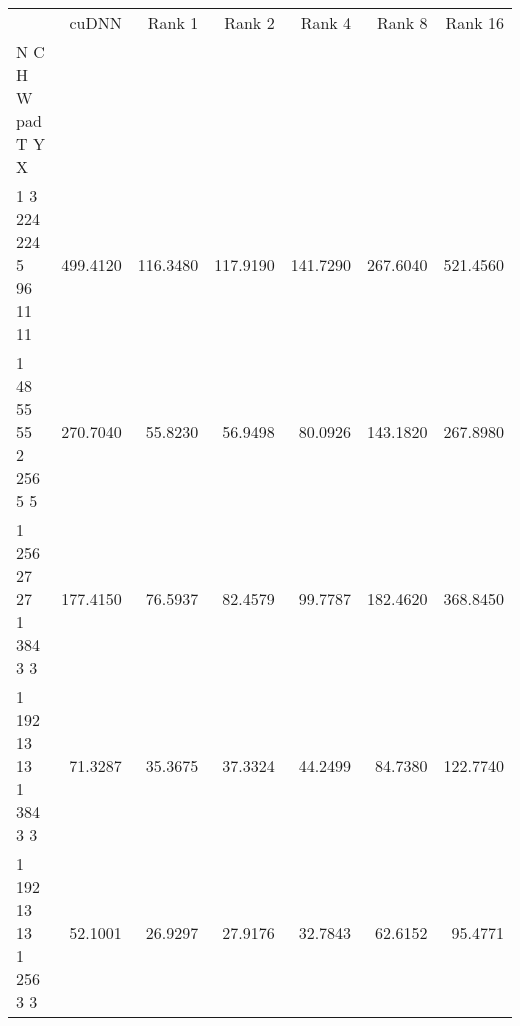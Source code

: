 \begin{tabular}{lrrrrrr}
\toprule
{} &     cuDNN &    Rank 1 &    Rank 2 &    Rank 4 &    Rank 8 &   Rank 16 \\
N C H W pad T Y X      &           &           &           &           &           &           \\
\midrule
1 3 224 224 5 96 11 11 &  499.4120 &  116.3480 &  117.9190 &  141.7290 &  267.6040 &  521.4560 \\
1 48 55 55 2 256 5 5   &  270.7040 &   55.8230 &   56.9498 &   80.0926 &  143.1820 &  267.8980 \\
1 256 27 27 1 384 3 3  &  177.4150 &   76.5937 &   82.4579 &   99.7787 &  182.4620 &  368.8450 \\
1 192 13 13 1 384 3 3  &   71.3287 &   35.3675 &   37.3324 &   44.2499 &   84.7380 &  122.7740 \\
1 192 13 13 1 256 3 3  &   52.1001 &   26.9297 &   27.9176 &   32.7843 &   62.6152 &   95.4771 \\
\bottomrule
\end{tabular}
